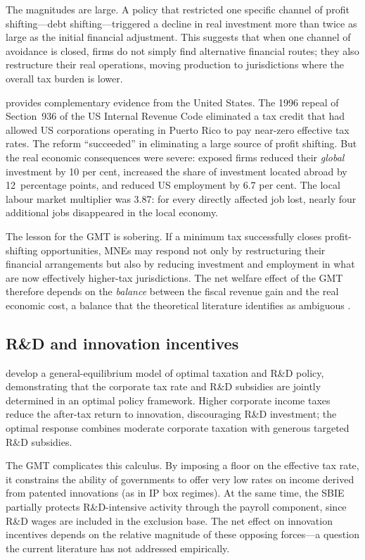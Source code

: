 \documentclass[12pt,a4paper]{article}
\begin{document}
The magnitudes are large.
A policy that restricted one specific channel of profit shifting---debt shifting---triggered a decline in real investment more than twice as large as the initial financial adjustment.
This suggests that when one channel of avoidance is closed, firms do not simply find alternative financial routes; they also restructure their real operations, moving production to jurisdictions where the overall tax burden is lower.

\textcite{suarezserrato2019} provides complementary evidence from the United States.
The 1996 repeal of Section~936 of the US Internal Revenue Code eliminated a tax credit that had allowed US corporations operating in Puerto Rico to pay near-zero effective tax rates.
The reform ``succeeded'' in eliminating a large source of profit shifting.
But the real economic consequences were severe: exposed firms reduced their \emph{global} investment by 10 per cent, increased the share of investment located abroad by 12~percentage points, and reduced US employment by 6.7 per cent.
The local labour market multiplier was 3.87: for every directly affected job lost, nearly four additional jobs disappeared in the local economy.

The lesson for the GMT is sobering.
If a minimum tax successfully closes profit-shifting opportunities, MNEs may respond not only by restructuring their financial arrangements but also by reducing investment and employment in what are now effectively higher-tax jurisdictions.
The net welfare effect of the GMT therefore depends on the \emph{balance} between the fiscal revenue gain and the real economic cost, a balance that the theoretical literature identifies as ambiguous \parencite{Johannesen2022}.

\subsection{R\&D and innovation incentives}

\textcite{akcigit2022} develop a general-equilibrium model of optimal taxation and R\&D policy, demonstrating that the corporate tax rate and R\&D subsidies are jointly determined in an optimal policy framework.
Higher corporate income taxes reduce the after-tax return to innovation, discouraging R\&D investment; the optimal response combines moderate corporate taxation with generous targeted R\&D subsidies.

The GMT complicates this calculus.
By imposing a floor on the effective tax rate, it constrains the ability of governments to offer very low rates on income derived from patented innovations (as in IP box regimes).
At the same time, the SBIE partially protects R\&D-intensive activity through the payroll component, since R\&D wages are included in the exclusion base.
The net effect on innovation incentives depends on the relative magnitude of these opposing forces---a question the current literature has not addressed empirically.
\end{document}

